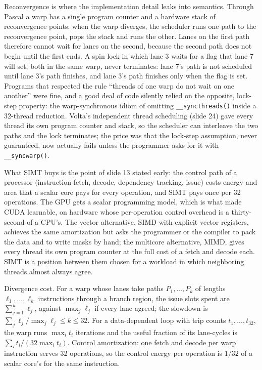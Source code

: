 \documentclass[11pt,letterpaper]{article}
\newenvironment{formulas}{\begin{tcolorbox}[formulabox]}{\end{tcolorbox}}
\begin{document}
Reconvergence is where the implementation detail leaks into semantics. Through Pascal a warp has a single program counter and a hardware stack of reconvergence points: when the warp diverges, the scheduler runs one path to the reconvergence point, pops the stack and runs the other. Lanes on the first path therefore cannot wait for lanes on the second, because the second path does not begin until the first ends. A spin lock in which lane 3 waits for a flag that lane 7 will set, both in the same warp, never terminates: lane 7's path is not scheduled until lane 3's path finishes, and lane 3's path finishes only when the flag is set. Programs that respected the rule ``threads of one warp do not wait on one another'' were fine, and a good deal of code silently relied on the opposite, lock-step property: the warp-synchronous idiom of omitting \texttt{\_\_syncthreads()} inside a 32-thread reduction. Volta's independent thread scheduling (slide 24) gave every thread its own program counter and stack, so the scheduler can interleave the two paths and the lock terminates; the price was that the lock-step assumption, never guaranteed, now actually fails unless the programmer asks for it with \texttt{\_\_syncwarp()}.

What SIMT buys is the point of slide 13 stated early: the control path of a processor (instruction fetch, decode, dependency tracking, issue) costs energy and area that a scalar core pays for every operation, and SIMT pays once per 32 operations. The GPU gets a scalar programming model, which is what made CUDA learnable, on hardware whose per-operation control overhead is a thirty-second of a CPU's. The vector alternative, SIMD with explicit vector registers, achieves the same amortization but asks the programmer or the compiler to pack the data and to write masks by hand; the multicore alternative, MIMD, gives every thread its own program counter at the full cost of a fetch and decode each. SIMT is a position between them chosen for a workload in which neighboring threads almost always agree.

\begin{formulas}
Divergence cost. For a warp whose lanes take paths $P_1,\dots,P_k$ of lengths $\ell_1,\dots,\ell_k$ instructions through a branch region, the issue slots spent are $\sum_{j=1}^{k}\ell_j$, against $\max_j \ell_j$ if every lane agreed; the slowdown is $\sum_j \ell_j/\max_j \ell_j \le k \le 32$. For a data-dependent loop with trip counts $t_1,\dots,t_{32}$, the warp runs $\max_i t_i$ iterations and the useful fraction of its lane-cycles is $\sum_i t_i/(32\max_i t_i)$. Control amortization: one fetch and decode per warp instruction serves 32 operations, so the control energy per operation is $1/32$ of a scalar core's for the same instruction.
\end{formulas}
\end{document}
